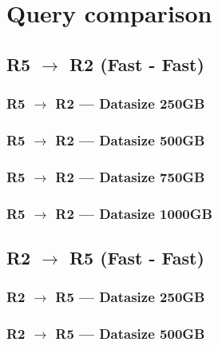 
\newpage
\section{Query comparison}
\subsection{R5 $\rightarrow$ R2 (Fast - Fast)}
\subsubsection{R5 $\rightarrow$ R2 --- Datasize 250GB}



\newpage
\subsubsection{R5 $\rightarrow$ R2 --- Datasize 500GB}



\newpage
\subsubsection{R5 $\rightarrow$ R2 --- Datasize 750GB}



\newpage
\subsubsection{R5 $\rightarrow$ R2 --- Datasize 1000GB}



\newpage


\subsection{R2 $\rightarrow$ R5 (Fast - Fast)}
\subsubsection{R2 $\rightarrow$ R5 --- Datasize 250GB}



\newpage
\subsubsection{R2 $\rightarrow$ R5 --- Datasize 500GB}



